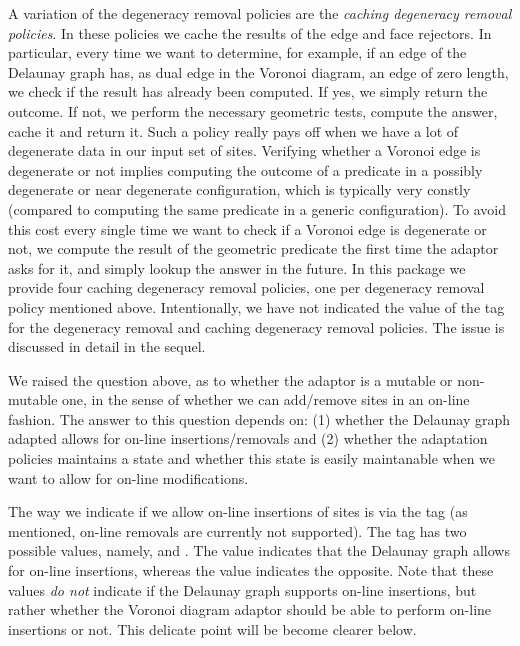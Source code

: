 A variation of the degeneracy removal policies are the
\emph{caching degeneracy removal policies}. In these policies we cache
the results of the edge and face rejectors. In particular, every time
we want to determine, for example, if an edge of the Delaunay graph
has, as dual edge in the Voronoi diagram, an edge of zero length, we
check if the result has already been computed. If yes, we simply
return the outcome. If not, we perform the necessary geometric tests,
compute the answer, cache it and return it. Such a policy really pays
off when we have a lot of degenerate data in our input set of
sites. Verifying whether a Voronoi edge is degenerate or not implies
computing the outcome of a predicate in a possibly degenerate or near
degenerate configuration, which is typically very constly (compared to
computing the same predicate in a generic configuration). To avoid this cost
every single time we want to check if a Voronoi edge is degenerate or
not, we compute the result of the geometric predicate the first time
the adaptor asks for it, and simply lookup the answer in the future.
In this package we provide four caching degeneracy removal policies,
one per degeneracy removal policy mentioned above.
Intentionally, we have not indicated the value of the
 tag for the degeneracy removal and caching
degeneracy removal policies. The issue is discussed in detail in the
sequel.

We raised the question above, as to whether the adaptor is a mutable
or non-mutable one, in the sense of whether we can add/remove sites in
an on-line fashion. The answer to this question depends on: (1) whether the
Delaunay graph adapted allows for on-line insertions/removals and (2)
whether the adaptation policies maintains a state and whether this
state is easily maintanable when we want to allow for on-line
modifications.

The way we indicate if we allow on-line insertions of sites is via the
 tag (as mentioned, on-line removals are currently not
supported). The  tag has two possible values,
namely,  and . The value
 indicates that the Delaunay graph allows for
on-line insertions, whereas the value  indicates
the opposite. Note that these values \emph{do not} indicate if the
Delaunay graph supports on-line insertions, but rather whether the
Voronoi diagram adaptor should be able to perform on-line insertions
or not. This delicate point will be become clearer below.

